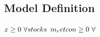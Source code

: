 \documentclass[11pt]{article}
\begin{document}
\subsection*{Model Definition}

\bigskip
$x\geq 0 ~ \forall stocks\\$
$m_retcon\geq 0 ~ \forall \\$
\end{document}
